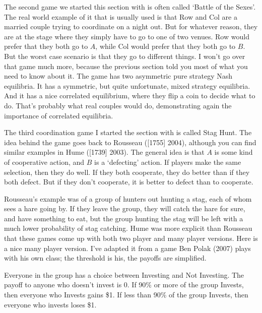 \documentclass[
  11pt,
  letterpaper,
]{scrbook}
\begin{document}
The second game we started this section with is often called `Battle of
the Sexes'. The real world example of it that is usually used is that
Row and Col are a married couple trying to coordinate on a night out.
But for whatever reason, they are at the stage where they simply have to
go to one of two venues. Row would prefer that they both go to \(A\),
while Col would prefer that they both go to \(B\). But the worst case
scenario is that they go to different things. I won't go over that game
much more, because the previous section told you most of what you need
to know about it. The game has two asymmetric pure strategy Nash
equilibria. It has a symmetric, but quite unfortunate, mixed strategy
equilibria. And it has a nice correlated equilibrium, where they flip a
coin to decide what to do. That's probably what real couples would do,
demonstrating again the importance of correlated equilibria.

The third coordination game I started the section with is called Stag
Hunt. The idea behind the game goes back to Rousseau ({[}1755{]} 2004),
although you can find similar examples in Hume ({[}1739{]} 2003). The
general idea is that \(A\) is some kind of cooperative action, and \(B\)
is a `defecting' action. If players make the same selection, then they
do well. If they both cooperate, they do better than if they both
defect. But if they don't cooperate, it is better to defect than to
cooperate.

Rousseau's example was of a group of hunters out hunting a stag, each of
whom sees a hare going by. If they leave the group, they will catch the
hare for sure, and have something to eat, but the group hunting the stag
will be left with a much lower probability of stag catching. Hume was
more explicit than Rousseau that these games come up with both two
player and many player versions. Here is a nice many player version.
I've adapted it from a game Ben Polak (2007) plays with his own class;
the threshold is his, the payoffs are simplified.

\begin{tcolorbox}[enhanced jigsaw, arc=.35mm, bottomrule=.15mm, bottomtitle=1mm, breakable, colback=white, colbacktitle=quarto-callout-tip-color!10!white, colframe=quarto-callout-tip-color-frame, coltitle=black, left=2mm, leftrule=.75mm, opacityback=0, opacitybacktitle=0.6, rightrule=.15mm, title=\textcolor{quarto-callout-tip-color}{\faLightbulb}\hspace{0.5em}{The Investment Game}, titlerule=0mm, toprule=.15mm, toptitle=1mm]

Everyone in the group has a choice between Investing and Not Investing.
The payoff to anyone who doesn't invest is 0. If 90\% or more of the
group Invests, then everyone who Invests gains \$1. If less than 90\% of
the group Invests, then everyone who invests loses \$1.

\end{tcolorbox}
\end{document}
